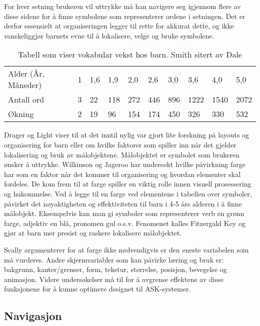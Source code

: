 For hver setning brukeren vil uttrykke må han navigere seg igjennom flere av disse sidene for å finne symbolene som representerer ordene i setningen. Det er derfor essensielt at organiseringen legger til rette for akkurat dette, og ikke vanskeliggjør barnets evne til å lokalisere, velge og bruke symbolene.

\begin{table}[h]
\begin{tabular}{llllllllll}
\hline
Alder (År, Måneder) & 1 & 1,6 & 1,9 & 2,0 & 2,6 & 3,0 & 3,6  & 4,0  & 5,0  \\ 
Antall ord          & 3 & 22  & 118 & 272 & 446 & 896 & 1222 & 1540 & 2072 \\ 
Økning              & 2 & 19  & 96  & 154 & 174 & 450 & 326  & 330  & 532  \\ \hline
\end{tabular}
\caption{Tabell som viser vokabular vekst hos barn.  Smith \cite{Smith} sitert av Dale \cite{Dale} }
\label{fig:BarnVak}
\end{table}


Drager og Light \cite{aac} viser til at det inntil nylig var gjort lite forskning på layouts og organisering for barn eller om hvilke faktorer som spiller inn når det gjelder lokalisering og bruk av målobjektene. Målobjektet er symbolet som brukeren ønsker å uttrykke. Wilkinson og Jageroo \cite{Wilkinson2006} har undersøkt hvilke påvirkning farge har som en faktor når det kommer til organisering og hvordan elementer skal fordeles. De kom frem til at farge spiller en viktig rolle innen visuell prosessering  og hukommelse. Ved å legge til en farge ved elementene i tabellen over symboler, påvirket det nøyaktigheten og effektiviteten til barn i 4-5 års alderen i å finne målobjekt. Eksempelvis kan man gi symboler som representerer verb en grønn farge, adjektiv en blå, pronomen gul o.s.v. Fenomenet kalles Fitzergald Key og gjør at barn mer presist og raskere lokalisere målobjektet.

Scally \cite{Scally} argumenterer for at farge ikke nødvendigvis er den eneste variabelen som må vurderes. Andre skjermvariabler som kan påvirke læring og bruk er: bakgrunn, kanter/grenser, form, tekstur, størrelse, posisjon, bevegelse og animasjon. Videre undersøkelser må til for å avgrense effektene av disse funksjonene for å kunne optimere designet til ASK-systemer.


\subsection{Navigasjon}
\label{subsec:navigasjon}

